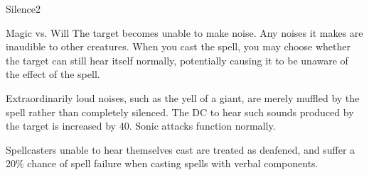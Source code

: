 \begin{spellsection}{Silence}{2}
\begin{spellheader}
    \begin{spelltargetinginfo}
    \end{spelltargetinginfo}
\end{spellheader}
\begin{spellcontent}
    \begin{spelleffects}
        \begin{spellattack}{Magic vs. Will}
            \spelleffect The target becomes unable to make noise. Any noises it makes are inaudible to other creatures. When you cast the spell, you may choose whether the target can still hear itself normally, potentially causing it to be unaware of the effect of the spell.

            Extraordinarily loud noises, such as the yell of a giant, are merely muffled by the spell rather than completely silenced. The DC to hear such sounds produced by the target is increased by 40. Sonic attacks function normally.
        \end{spellattack}
        \spelldur \durshort \dismissable
    \end{spelleffects}
\end{spellcontent}
\begin{spellfooter}
    \spellnotes Spellcasters unable to hear themselves cast are treated as deafened, and suffer a 20\% chance of spell failure when casting spells with verbal components.
\end{spellfooter}
\end{spellsection}

